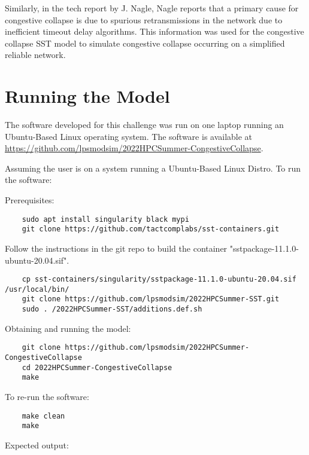 \documentclass{article}
\begin{document}
Similarly, in the tech report by J. Nagle\cite{RFC0896}, Nagle reports that a primary cause for congestive collapse is due to spurious retransmissions in the network due to inefficient timeout delay algorithms. This information was used for the congestive collapse SST model to simulate congestive collapse occurring on a simplified reliable network.
\section{Running the Model}

The software developed for this challenge was run on one laptop running an Ubuntu-Based Linux operating system.
The software is available at \href{https://github.com/lpsmodsim/2022HPCSummer-CongestiveCollapse}{https://github.com/lpsmodsim/2022HPCSummer-CongestiveCollapse}.\newline

\noindent Assuming the user is on a system running a Ubuntu-Based Linux Distro. To run the software:\newline

\noindent Prerequisites: 

\begin{verbatim}
	sudo apt install singularity black mypi
	git clone https://github.com/tactcomplabs/sst-containers.git
\end{verbatim}

\noindent Follow the instructions in the git repo to build the container "sstpackage-11.1.0-ubuntu-20.04.sif".

\begin{verbatim}
	cp sst-containers/singularity/sstpackage-11.1.0-ubuntu-20.04.sif /usr/local/bin/
	git clone https://github.com/lpsmodsim/2022HPCSummer-SST.git
	sudo . /2022HPCSummer-SST/additions.def.sh
\end{verbatim}

\noindent Obtaining and running the model:

\begin{verbatim}
	git clone https://github.com/lpsmodsim/2022HPCSummer-CongestiveCollapse
	cd 2022HPCSummer-CongestiveCollapse
	make
\end{verbatim}

\noindent To re-run the software:

\begin{verbatim}
	make clean
	make
\end{verbatim}

\noindent Expected output:
\end{document}
